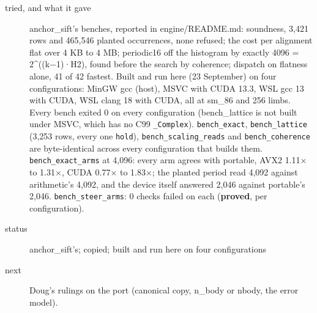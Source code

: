 \begin{description}
\item[{tried, and what it gave}] anchor\_\allowbreak{}sift's benches, reported in engine/README.md: soundness, 3,421 rows and 465,546 planted occurrences, none refused; the cost per alignment flat over 4 KB to 4 MB; periodic16 off the histogram by exactly 4096 = 2\textasciicircum{}((k−1)·H2), found before the search by coherence; dispatch on flatness alone, 41 of 42 fastest. Built and run here (23 September) on four configurations: MinGW gcc (host), MSVC with CUDA 13.3, WSL gcc 13 with CUDA, WSL clang 18 with CUDA, all at sm\_\allowbreak{}86 and 256 limbs. Every bench exited 0 on every configuration (bench\_\allowbreak{}lattice is not built under MSVC, which has no C99 \texttt{\_\allowbreak{}Complex}). \texttt{bench\_\allowbreak{}exact}, \texttt{bench\_\allowbreak{}lattice} (3,253 rows, every one \texttt{hold}), \texttt{bench\_\allowbreak{}scaling\_\allowbreak{}reads} and \texttt{bench\_\allowbreak{}coherence} are byte-identical across every configuration that builds them. \texttt{bench\_\allowbreak{}exact\_\allowbreak{}arms} at 4,096: every arm agrees with portable, AVX2 1.11× to 1.31×, CUDA 0.77× to 1.83×; the planted period read 4,092 against arithmetic's 4,092, and the device itself answered 2,046 against portable's 2,046. \texttt{bench\_\allowbreak{}steer\_\allowbreak{}arms}: 0 checks failed on each (\textbf{proved}, per configuration).
\item[{status}] anchor\_\allowbreak{}sift's; copied; built and run here on four configurations
\item[{next}] Doug's rulings on the port (canonical copy, n\_\allowbreak{}body or nbody, the error model).
\end{description}

